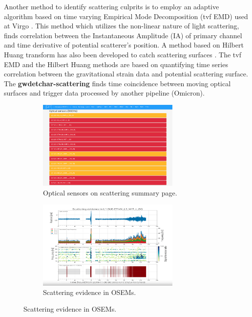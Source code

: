 \documentclass[12pt]{iopart}
\begin{document}
Another method to identify scattering culprits is to employ an adaptive algorithm based on time varying Empirical Mode Decomposition (tvf EMD) used at Virgo \cite{Longo_2020}. This method which utilizes the non-linear nature of light scattering, finds correlation between the Instantaneous Amplitude (IA) of primary channel and time derivative of potential scatterer's position. A method based on Hilbert Huang transform has also been developed to catch scattering surfaces \cite{Valdes_2017}. The tvf EMD and the Hilbert Huang  methods are based on quantifying time series correlation between the gravitational strain data and potential scattering surface. The \textbf{gwdetchar-scattering} finds time coincidence between moving optical surfaces and trigger data processed by another pipeline (Omicron).

\begin{figure}[h]
\captionsetup[subfigure]{font=scriptsize,labelfont=scriptsize}
   \centering
    \begin{subfigure}[b]{0.45\textwidth}
        \centering
         \includegraphics[width= 7cm]{scattering_page.png}
         \caption{Optical sensors on scattering summary page.}
         \label{fig:summary_scattering}
    \end{subfigure}
    \hfill
    \begin{subfigure}[b]{0.5\textwidth}
        \centering
         \includegraphics[width =7cm]{optic_motion.png}
         \caption{ Scattering evidence in OSEMs.}
         \label{fig:optic_motion}
         

\end{subfigure}
\end{figure}
\end{document}
